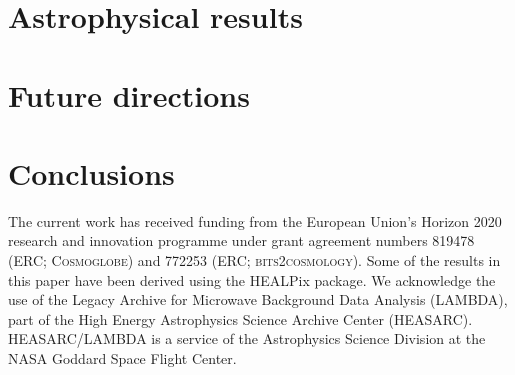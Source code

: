 \documentclass{aa}
\begin{document}
\clearpage
\section{Astrophysical results}


\clearpage
\section{Future directions}

\clearpage
\section{Conclusions}




\blindtext





\begin{acknowledgements}
 The current work has received funding from the European
  Union’s Horizon 2020 research and innovation programme under grant
  agreement numbers 819478 (ERC; \textsc{Cosmoglobe}) and 772253 (ERC;
  \textsc{bits2cosmology}). Some of the results in this paper have been derived using the HEALPix \citep{HEALPIX} package.
  We acknowledge the use of the Legacy Archive for Microwave Background Data
  Analysis (LAMBDA), part of the High Energy Astrophysics Science Archive Center
  (HEASARC). HEASARC/LAMBDA is a service of the Astrophysics Science Division at
  the NASA Goddard Space Flight Center.  
\end{acknowledgements}


%



\end{document}
